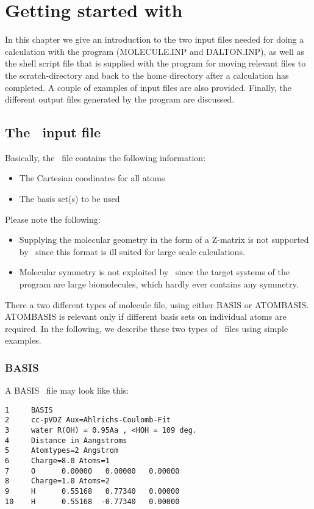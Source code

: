 \chapter{Getting started with {\lsdalton}}\label{ch:starting}

In this chapter we give an introduction to the two input files needed
for doing a calculation with the {\lsdalton} program
(MOLECULE.INP and DALTON.INP), as well as the
shell script file that is supplied with the program for moving
relevant files to the scratch-directory and back to the home directory
after a calculation has completed. A couple of examples of
input files  are also provided. Finally, the different output files
generated by the program are discussed.

\section{The \mol\ input file}

Basically, the \mol\ file contains the following information:
\begin{itemize}
\item The Cartesian coodinates for all atoms
\item The basis set(s) to be used
\end{itemize}

Please note the following:
\begin{itemize}
\item Supplying the molecular geometry in the form of a Z-matrix 
is not supported
by \lsdalton\, since this format is ill suited for large scale 
calculations.
\item Molecular symmetry is not exploited by \lsdalton\, since
the target systems of the program are large biomolecules, which
hardly ever contains any symmetry. 
\end{itemize}

There a two different types of molecule file, using either BASIS or ATOMBASIS.
ATOMBASIS is relevant only if different basis sets on individual atoms are required.
In the following, we describe these two types of \mol\ files using simple examples.

\subsection{BASIS}
A BASIS \mol\ file may look like this:
\begin{verbatim}
1     BASIS
2     cc-pVDZ Aux=Ahlrichs-Coulomb-Fit
3     water R(OH) = 0.95Aa , <HOH = 109 deg.
4     Distance in Aangstroms
5     Atomtypes=2 Angstrom
6     Charge=8.0 Atoms=1
7     O      0.00000   0.00000   0.00000
8     Charge=1.0 Atoms=2
9     H      0.55168   0.77340   0.00000
10    H      0.55168  -0.77340   0.00000
\end{verbatim} 

